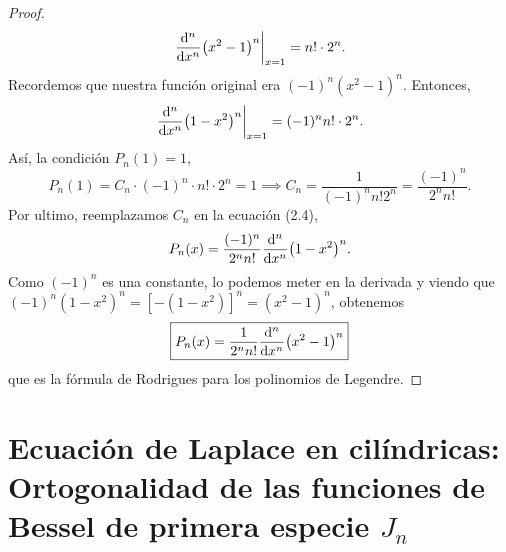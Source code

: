 \documentclass[11pt]{article}
\theoremstyle{definition}
\numberwithin{equation}{section}
\begin{document}
\begin{proof}
\begin{equation}
    \left. \dv[n]{x} (x^2 - 1)^n \right|_{x=1} = n! \cdot 2^n.
	\end{equation}
	Recordemos que nuestra función original era $(-1)^n (x^2 - 1)^n$. Entonces,
	\begin{equation}
    \left. \dv[n]{x} (1 - x^2)^n \right|_{x=1} = (-1)^n n! \cdot 2^n.
	\end{equation}
	Así, la condición $P_n(1) = 1$,
	\begin{equation}
    P_n(1) = C_n \cdot (-1)^n \cdot n! \cdot 2^n = 1 \implies C_n = \frac{1}{(-1)^n n! 2^n} = \frac{(-1)^n}{2^n n!}.
	\end{equation}
	Por ultimo, reemplazamos $C_n$ en la ecuación (2.4),
	\begin{equation}
    P_n(x) = \frac{(-1)^n}{2^n n!} \dv[n]{x} (1 - x^2)^n.
	\end{equation}
	Como $(-1)^n$ es una constante, lo podemos meter en la derivada y viendo que $(-1)^n (1 - x^2)^n = [-(1 - x^2)]^n = (x^2 - 1)^n$, obtenemos
	\begin{equation}
    \boxed{ P_n(x) = \frac{1}{2^n n!} \dv[n]{x} (x^2 - 1)^n }
	\end{equation}
	que es la fórmula de Rodrigues para los polinomios de Legendre.
\end{proof}

\section{Ecuación de Laplace en cilíndricas: Ortogonalidad de las funciones de Bessel de primera especie $J_n$}
\end{document}
